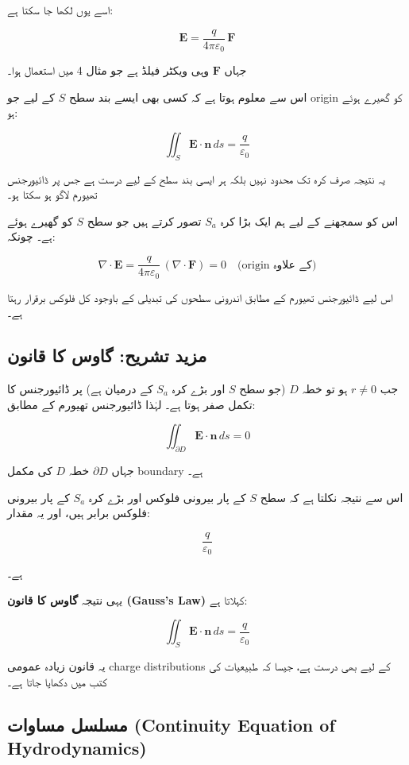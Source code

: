 \begin{enumerate}
اسے یوں لکھا جا سکتا ہے:

\[
\mathbf{E}
=
\frac{q}{4\pi \varepsilon_0}\,\mathbf{F}
\]

جہاں \( \mathbf{F} \) وہی ویکٹر فیلڈ ہے جو مثال 4 میں استعمال ہوا۔

\bigskip

اس سے معلوم ہوتا ہے کہ کسی بھی ایسے بند سطح \( S \) کے لیے جو origin کو گھیرے ہوئے ہو:

\[
\iint_S \mathbf{E}\cdot \mathbf{n}\, ds
=
\frac{q}{\varepsilon_0}
\]

یہ نتیجہ صرف کرہ تک محدود نہیں بلکہ ہر ایسی بند سطح کے لیے درست ہے جس پر ڈائیورجنس تھیورم لاگو ہو سکتا ہو۔

\bigskip

اس کو سمجھنے کے لیے ہم ایک بڑا کرہ \( S_a \) تصور کرتے ہیں جو سطح \( S \) کو گھیرے ہوئے ہے۔ چونکہ:

\[
\nabla \cdot \mathbf{E}
=
\frac{q}{4\pi \varepsilon_0}\,(\nabla \cdot \mathbf{F})
=
0
\quad \text{(origin کے علاوہ)}
\]

اس لیے ڈائیورجنس تھیورم کے مطابق اندرونی سطحوں کی تبدیلی کے باوجود کل فلوکس برقرار رہتا ہے۔


\subsection*{مزید تشریح: گاوس کا قانون}

جب \( r \neq 0 \) ہو تو خطہ \( D \) (جو سطح \( S \) اور بڑے کرہ \( S_a \) کے درمیان ہے) پر ڈائیورجنس کا تکمل صفر ہوتا ہے۔ لہٰذا ڈائیورجنس تھیورم کے مطابق:

\[
\iint_{\partial D} \mathbf{E}\cdot \mathbf{n}\, ds = 0
\]

جہاں \( \partial D \) خطہ \( D \) کی مکمل boundary ہے۔

اس سے نتیجہ نکلتا ہے کہ سطح \( S \) کے پار بیرونی فلوکس اور بڑے کرہ \( S_a \) کے پار بیرونی فلوکس برابر ہیں، اور یہ مقدار:

\[
\frac{q}{\varepsilon_0}
\]

ہے۔

یہی نتیجہ \textbf{گاوس کا قانون (Gauss’s Law)} کہلاتا ہے:

\[
\iint_S \mathbf{E}\cdot \mathbf{n}\, ds
=
\frac{q}{\varepsilon_0}
\]

یہ قانون زیادہ عمومی charge distributions کے لیے بھی درست ہے، جیسا کہ طبیعیات کی کتب میں دکھایا جاتا ہے۔

\bigskip

\subsection*{مسلسل مساوات (Continuity Equation of Hydrodynamics)}


\end{enumerate}
